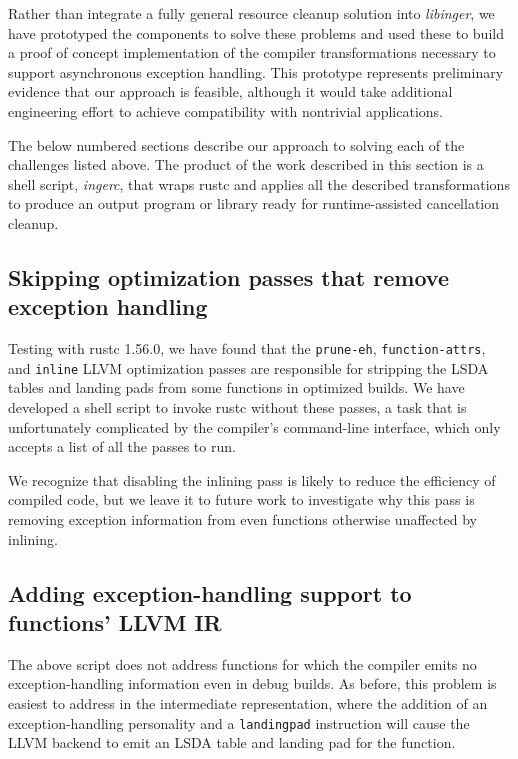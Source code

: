 Rather than integrate a fully general resource cleanup solution into
\textit{libinger}, we have prototyped the components to solve these problems and used
these to build a proof of concept implementation of the compiler transformations
necessary to support asynchronous exception handling.  This prototype represents
preliminary evidence that our approach is feasible, although it would take additional
engineering effort to achieve compatibility with nontrivial applications.

The below numbered sections describe our approach to solving each of the
challenges listed above.  The product of the work described in this section is a
shell script, \textit{ingerc}, that wraps rustc and applies all the described
transformations to produce an output program or library ready for runtime-assisted
cancellation cleanup.


\subsection{Skipping optimization passes that remove exception handling}
\label{sec:ingerc:skip}

Testing with rustc 1.56.0, we have found that the \texttt{prune-eh},
\texttt{function-attrs}, and \texttt{inline} LLVM optimization passes are
responsible for stripping the LSDA tables and landing pads from some functions in
optimized builds.  We have developed a shell script to invoke rustc without these
passes, a task that is unfortunately complicated by the compiler's command-line
interface, which only accepts a list of all the passes to run.

We recognize that disabling the inlining pass is likely to reduce the efficiency of
compiled code, but we leave it to future work to investigate why this pass is
removing exception information from even functions otherwise unaffected by inlining.


\subsection{Adding exception-handling support to functions' LLVM IR}
\label{sec:ingerc:optimization}

The above script does not address functions for which the compiler emits no
exception-handling information even in debug builds.  As before, this problem is
easiest to address in the intermediate representation, where the addition of an
exception-handling personality and a \texttt{landingpad} instruction will cause the
LLVM backend to emit an LSDA table and landing pad for the function.

